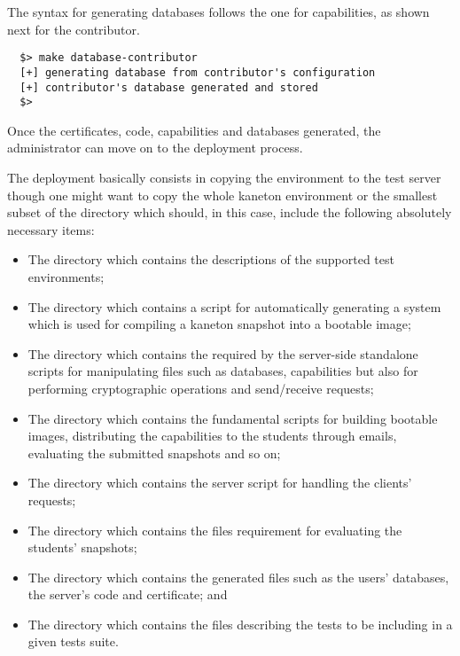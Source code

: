 The syntax for generating databases follows the one for capabilities, as
shown next for the contributor.

\begin{verbatim}
  $> make database-contributor
  [+] generating database from contributor's configuration
  [+] contributor's database generated and stored
  $> 
\end{verbatim}

Once the certificates, code, capabilities and databases generated, the
administrator can move on to the deployment process.


The deployment basically consists in copying the  environment
to the test server though one might want to copy the whole kaneton environment
or the smallest subset of the  directory which should, in this
case, include the following absolutely necessary items:

\begin{itemize}
  \item
    The  directory which contains the descriptions
    of the supported test environments;
  \item
    The  directory which contains a script for
    automatically generating a  system which is used
    for compiling a kaneton snapshot into a bootable image;
  \item
    The  directory which contains the  required by the server-side standalone scripts
    for manipulating files such as databases, capabilities \etc{} but also
    for performing cryptographic operations and send/receive 
    requests;
  \item
    The  directory which contains the fundamental
    scripts for building bootable images, distributing the capabilities to
    the students through emails, evaluating the submitted snapshots and so on;
  \item
    The  directory which contains the server script
    for handling the clients' requests;
  \item
    The  directory which contains the files requirement
    for evaluating the students' snapshots;
  \item
    The  directory which contains the generated files
    such as the users' databases, the server's code and certificate; and
  \item
    The  directory which contains the files describing
    the tests to be including in a given tests suite.
\end{itemize}

